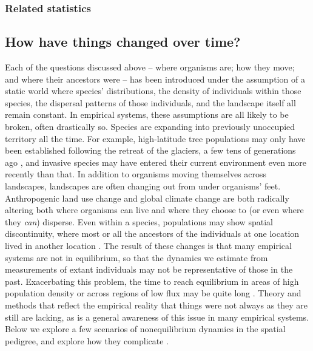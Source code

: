 \documentclass{ar-1col}
\newcommand{\g}[1]{{\color{blue}{#1}}}
\newcommand{\todo}[1]{{\textbf{\color{red}{#1}}}}
\begin{document}
\subsubsection{Related statistics}

\todo{Fst, various IBD-metrics???}


\subsection{How have things changed over time?}

Each of the questions discussed above --
where organisms are;
how they move;
and where their ancestors were
-- has been introduced under the assumption of a static world
where species' distributions,
the density of individuals within those species,
the dispersal patterns of those individuals,
and the landscape itself all remain constant.
In empirical systems,
these assumptions are all likely to be broken,
often drastically so.
Species are expanding into previously unoccupied territory all the time.
For example, 
high-latitude tree populations may only have been established
following the retreat of the glaciers,
a few tens of generations ago \citep{WhitlockMcCauley1999},
and invasive species may have entered their current
environment even more recently than that.
In addition to organisms moving themselves across landscapes,
landscapes are often changing out from under organisms' feet.
Anthropogenic land use change
and global climate change
are both radically altering both where organisms can live
and where they choose to
(or even where they \textit{can}) disperse.
Even within a species,
populations may show spatial discontinuity,
where most or all the ancestors of the individuals at one location
lived in another location 
\citep{bi2013unlocking,skoglund2014investigating,lazaridis_ancient_2014, joseph2018inference}.
The result of these changes is that many empirical systems
are not in equilibrium,
so that the dynamics we estimate from
measurements of extant individuals may
not be representative of those in the past.
Exacerbating this problem,
the time to reach equilibrium
in areas of high population density
or across regions of low flux
may be quite long
\citep{CrowAoki1984group, whitlock1992temporal, slatkin1993isolation, WhitlockMcCauley1999}.
Theory and methods that
reflect the empirical reality that things were not always as they are
still are lacking, 
as is a general awareness of this issue in many empirical systems.
Below we explore a few scenarios of nonequilibrium dynamics
in the spatial pedigree,
and explore how they complicate \g{inference}.
\end{document}
